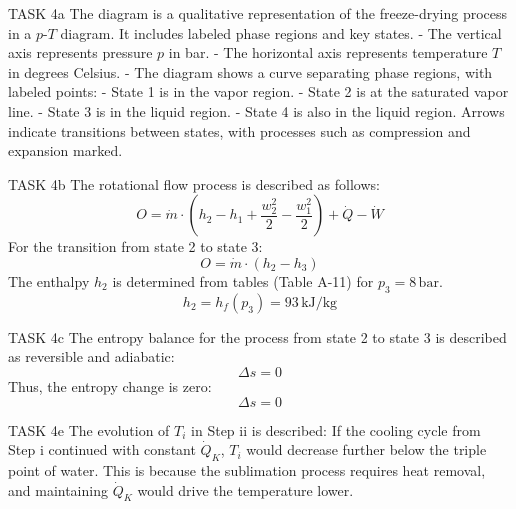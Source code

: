 TASK 4a  
The diagram is a qualitative representation of the freeze-drying process in a \( p \)-\( T \) diagram. It includes labeled phase regions and key states.  
- The vertical axis represents pressure \( p \) in bar.  
- The horizontal axis represents temperature \( T \) in degrees Celsius.  
- The diagram shows a curve separating phase regions, with labeled points:  
  - State 1 is in the vapor region.  
  - State 2 is at the saturated vapor line.  
  - State 3 is in the liquid region.  
  - State 4 is also in the liquid region.  
Arrows indicate transitions between states, with processes such as compression and expansion marked.  

TASK 4b  
The rotational flow process is described as follows:  
\[
O = \dot{m} \cdot (h_2 - h_1 + \frac{w_2^2}{2} - \frac{w_1^2}{2}) + \dot{Q} - \dot{W}
\]  
For the transition from state 2 to state 3:  
\[
O = \dot{m} \cdot (h_2 - h_3)
\]  
The enthalpy \( h_2 \) is determined from tables (Table A-11) for \( p_3 = 8 \, \text{bar} \).  
\[
h_2 = h_f(p_3) = 93 \, \text{kJ/kg}
\]  

TASK 4c  
The entropy balance for the process from state 2 to state 3 is described as reversible and adiabatic:  
\[
\Delta s = 0
\]  
Thus, the entropy change is zero:  
\[
\Delta s = 0
\]  

TASK 4e  
The evolution of \( T_i \) in Step ii is described:  
If the cooling cycle from Step i continued with constant \( \dot{Q}_K \), \( T_i \) would decrease further below the triple point of water. This is because the sublimation process requires heat removal, and maintaining \( \dot{Q}_K \) would drive the temperature lower.